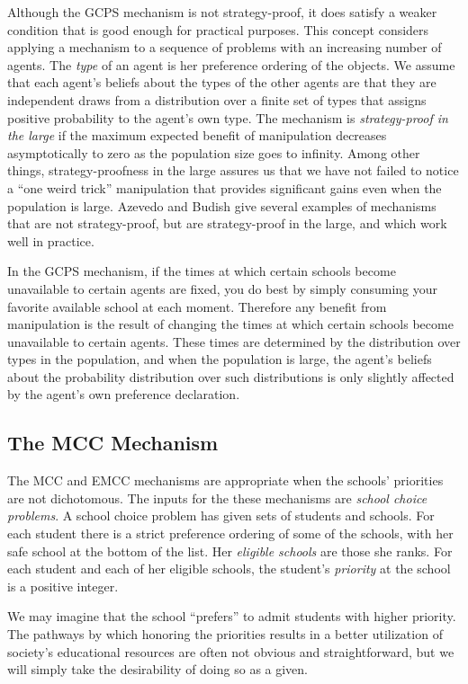 \documentclass[12pt]{article}
\theoremstyle{definition}
\begin{document}
Although the GCPS mechanism is not strategy-proof, it does satisfy a
weaker condition that is good enough for practical purposes.  This
concept considers applying a mechanism to a sequence of problems with
an increasing number of agents.  The \emph{type} of an agent is her
preference ordering of the objects.  We assume that each agent's
beliefs about the types of the other agents are that they are
independent draws from a distribution over a finite set of types that
assigns positive probability to the agent's own type.  The mechanism
is \emph{strategy-proof in the large} \citep{ab19res} if the maximum
expected benefit of manipulation decreases asymptotically to zero as
the population size goes to infinity.  Among other things,
strategy-proofness in the large assures us that we have not failed to
notice a ``one weird trick'' manipulation that provides significant
gains even when the population is large.  Azevedo and Budish give
several examples of mechanisms that are not strategy-proof, but are
strategy-proof in the large, and which work well in practice.

In the GCPS mechanism, if the times at which certain schools become
unavailable to certain agents are fixed, you do best by simply
consuming your favorite available school at each moment.  Therefore any
benefit from manipulation is the result of changing the times at which
certain schools become unavailable to certain agents.  These times are
determined by the distribution over types in the population, and when
the population is large, the agent's beliefs about the probability
distribution over such distributions is only slightly affected by the
agent's own preference declaration.
 
\subsection{The MCC Mechanism}

The MCC and EMCC mechanisms are appropriate when the schools'
priorities are not dichotomous.  The inputs for the these mechanisms
are \emph{school choice problems}.  A school choice problem has given
sets of students and schools.  For each student there is a strict
preference ordering of some of the schools, with her safe school at
the bottom of the list.  Her \emph{eligible schools} are those she
ranks.  For each student and each of her eligible schools, the
student's \emph{priority} at the school is a positive integer.

We may imagine that the school ``prefers'' to admit students with
higher priority.  The pathways by which honoring the priorities
results in a better utilization of society's educational resources are
often not obvious and straightforward, but we will simply take the
desirability of doing so as a given.
\end{document}
